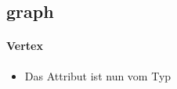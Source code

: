 \subsection{graph}
\paragraph{Vertex}
\begin{itemize}
 \item Das Attribut  ist nun vom Typ 
\end{itemize}
